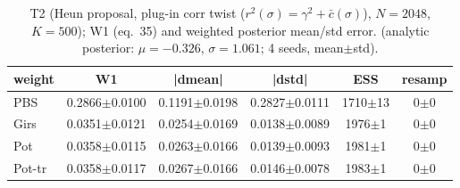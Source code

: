 \begin{table}[ht]
\centering
\caption{T2 (Heun proposal, plug-in corr twist ($r^2(\sigma)=\gamma^2+\bar c(\sigma)$), $N=2048$, $K=500$); W1 (eq.~35) and weighted posterior mean/std error. (analytic posterior: $\mu=-0.326$, $\sigma=1.061$; 4 seeds, mean$\pm$std).}
\label{tab:toy_t2_heun}
\begin{tabular}{lccccc}
\toprule
weight & W1 & |dmean| & |dstd| & ESS & resamp \\
\midrule
PBS & 0.2866$\pm$0.0100 & 0.1191$\pm$0.0198 & 0.2827$\pm$0.0111 & 1710$\pm$13 & 0$\pm$0 \\
Girs & 0.0351$\pm$0.0121 & 0.0254$\pm$0.0169 & 0.0138$\pm$0.0089 & 1976$\pm$1 & 0$\pm$0 \\
Pot & 0.0358$\pm$0.0115 & 0.0263$\pm$0.0166 & 0.0139$\pm$0.0093 & 1981$\pm$1 & 0$\pm$0 \\
Pot-tr & 0.0358$\pm$0.0117 & 0.0267$\pm$0.0166 & 0.0146$\pm$0.0078 & 1983$\pm$1 & 0$\pm$0 \\
\bottomrule
\end{tabular}
\end{table}
